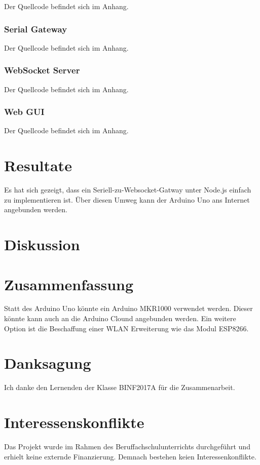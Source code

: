 Der Quellcode befindet sich im Anhang.

\hypertarget{serial-gateway-1}{%
\subsubsection{Serial Gateway}\label{serial-gateway-1}}

Der Quellcode befindet sich im Anhang.

\hypertarget{websocket-server}{%
\subsubsection{WebSocket Server}\label{websocket-server}}

Der Quellcode befindet sich im Anhang.

\hypertarget{web-gui}{%
\subsubsection{Web GUI}\label{web-gui}}

Der Quellcode befindet sich im Anhang.

\hypertarget{resultate}{%
\section{Resultate}\label{resultate}}

Es hat sich gezeigt, dass ein Seriell-zu-Websocket-Gatway unter Node.js
einfach zu implementieren ist. Über diesen Umweg kann der Arduino Uno
ans Internet angebunden werden.

\hypertarget{diskussion}{%
\section{Diskussion}\label{diskussion}}

\hypertarget{zusammenfassung}{%
\section{Zusammenfassung}\label{zusammenfassung}}

Statt des Arduino Uno könnte ein Arduino MKR1000 verwendet werden.
Dieser könnte kann auch an die Arduino Clound angebunden werden. Ein
weitere Option ist die Beschaffung einer WLAN Erweiterung wie das Modul
ESP8266.

\hypertarget{danksagung}{%
\section{Danksagung}\label{danksagung}}

Ich danke den Lernenden der Klasse BINF2017A für die Zusammenarbeit.

\hypertarget{interessenskonflikte}{%
\section{Interessenskonflikte}\label{interessenskonflikte}}

Das Projekt wurde im Rahmen des Beruffachschulunterrichts durchgeführt
und erhielt keine externde Finanzierung. Demnach bestehen keien
Interessenkonflikte.
